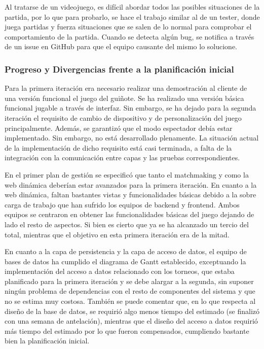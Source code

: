 Al tratarse de un videojuego, es difícil abordar todos las posibles situaciones de la partida, por lo que para probarlo, se hace el trabajo similar al de un tester, donde juega partidas y fuerza situaciones que se salen de lo normal para comprobar el comportamiento de la partida. Cuando se detecta algún bug, se notifica a través de un issue en GitHub para que el equipo causante del mismo lo solucione.



\subsubsection*{Progreso y Divergencias frente a la planificación inicial}

Para la primera iteración era necesario realizar una demostración al cliente de una versión funcional el juego del guiñote. Se ha realizado una versión básica funcional jugable a través de interfaz. Sin embargo, se ha dejado para la segunda iteración el requisito de cambio de dispositivo y de personalización del juego principalmente. Además, se garantizó que el modo espectador debía estar implementado. Sin embargo, no está desarrollado plenamente. La situación actual de la implementación de dicho requisito está casi terminada, a falta de la integración con la comunicación entre capas y las pruebas correspondientes.

En el primer plan de gestión se especificó que tanto el matchmaking y como la web dinámica deberían estar avanzados para la primera iteración. En cuanto a la web dinámica, faltan bastantes vistas y funcionalidades básicas debido a la sobre carga de trabajo que han sufrido los equipos de backend y frontend. Ambos equipos se centraron en obtener las funcionalidades básicas del juego dejando de lado el resto de aspectos. Si bien es cierto que ya se ha alcanzado un tercio del total, mientras que el objetivo en esta primera iteración era de la mitad.

En cuanto a la capa de persistencia y la capa de acceso de datos, el equipo de bases de datos ha cumplido el diagrama de Gantt establecido, exceptuando la implementación del acceso a datos relacionado con los torneos, que estaba planificado para la primera iteración y se debe alargar a la segunda, sin suponer ningún problema de dependencias con el resto de componentes del sistema y que no se estima muy costosa. También se puede comentar que, en lo que respecta al diseño de la base de datos, se requirió algo menos tiempo del estimado (se finalizó con una semana de antelación), mientras que el diseño del acceso a datos requirió más tiempo del estimado por lo que fueron compensados, cumpliendo bastante bien la planificación inicial.

